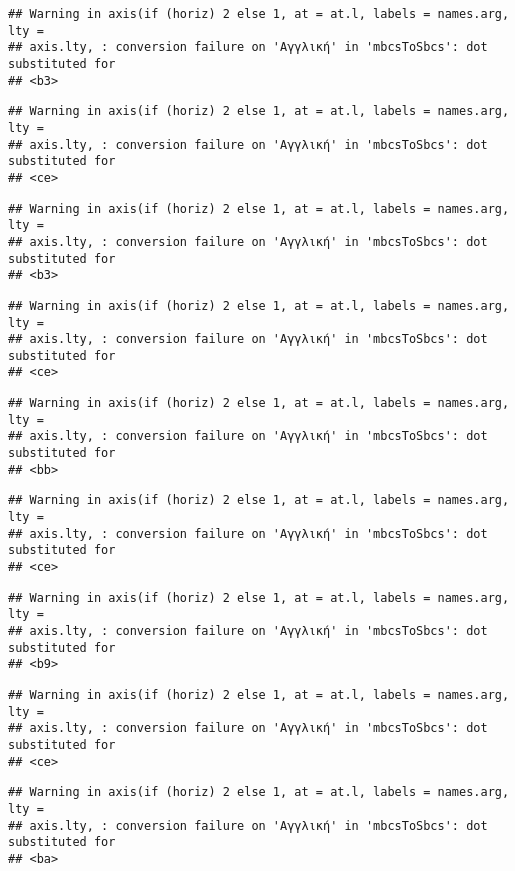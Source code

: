 \documentclass[
]{article}
\begin{document}
\begin{verbatim}
## Warning in axis(if (horiz) 2 else 1, at = at.l, labels = names.arg, lty =
## axis.lty, : conversion failure on 'Αγγλική' in 'mbcsToSbcs': dot substituted for
## <b3>
\end{verbatim}

\begin{verbatim}
## Warning in axis(if (horiz) 2 else 1, at = at.l, labels = names.arg, lty =
## axis.lty, : conversion failure on 'Αγγλική' in 'mbcsToSbcs': dot substituted for
## <ce>
\end{verbatim}

\begin{verbatim}
## Warning in axis(if (horiz) 2 else 1, at = at.l, labels = names.arg, lty =
## axis.lty, : conversion failure on 'Αγγλική' in 'mbcsToSbcs': dot substituted for
## <b3>
\end{verbatim}

\begin{verbatim}
## Warning in axis(if (horiz) 2 else 1, at = at.l, labels = names.arg, lty =
## axis.lty, : conversion failure on 'Αγγλική' in 'mbcsToSbcs': dot substituted for
## <ce>
\end{verbatim}

\begin{verbatim}
## Warning in axis(if (horiz) 2 else 1, at = at.l, labels = names.arg, lty =
## axis.lty, : conversion failure on 'Αγγλική' in 'mbcsToSbcs': dot substituted for
## <bb>
\end{verbatim}

\begin{verbatim}
## Warning in axis(if (horiz) 2 else 1, at = at.l, labels = names.arg, lty =
## axis.lty, : conversion failure on 'Αγγλική' in 'mbcsToSbcs': dot substituted for
## <ce>
\end{verbatim}

\begin{verbatim}
## Warning in axis(if (horiz) 2 else 1, at = at.l, labels = names.arg, lty =
## axis.lty, : conversion failure on 'Αγγλική' in 'mbcsToSbcs': dot substituted for
## <b9>
\end{verbatim}

\begin{verbatim}
## Warning in axis(if (horiz) 2 else 1, at = at.l, labels = names.arg, lty =
## axis.lty, : conversion failure on 'Αγγλική' in 'mbcsToSbcs': dot substituted for
## <ce>
\end{verbatim}

\begin{verbatim}
## Warning in axis(if (horiz) 2 else 1, at = at.l, labels = names.arg, lty =
## axis.lty, : conversion failure on 'Αγγλική' in 'mbcsToSbcs': dot substituted for
## <ba>
\end{verbatim}
\end{document}
